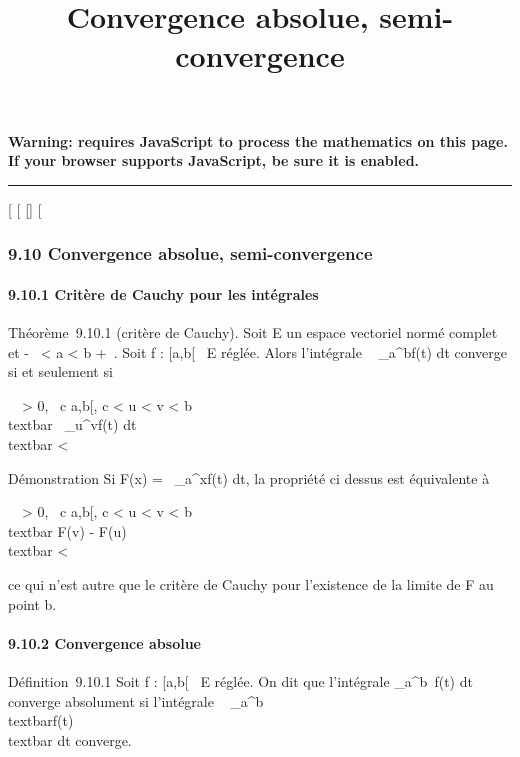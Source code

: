 \documentclass[]{article}
\title{Convergence absolue, semi-convergence}
\author{}
\date{}
\begin{document}
\maketitle

\textbf{Warning: 
requires JavaScript to process the mathematics on this page.\\ If your
browser supports JavaScript, be sure it is enabled.}

\begin{center}\rule{3in}{0.4pt}\end{center}

{[}
{[}
{[}{]}
{[}

\subsubsection{9.10 Convergence absolue, semi-convergence}

\paragraph{9.10.1 Critère de Cauchy pour les intégrales}

Théorème~9.10.1 (critère de Cauchy). Soit E un espace vectoriel normé
complet et -\infty~ \textless{} a \textless{} b \leq +\infty~. Soit f : {[}a,b{[}\rightarrow~ E
réglée. Alors l'intégrale \int ~
\_a^bf(t) dt converge si et seulement si~

\forall~~\epsilon \textgreater{} 0,
\exists~c \in {[}a,b{[}, c \textless{} u \textless{} v
\textless{} b \rigtharrow~\\textbar{}\int ~
\_u^vf(t) dt\\textbar{} \textless{} \epsilon

Démonstration Si F(x) =\int ~
\_a^xf(t) dt, la propriété ci dessus est équivalente à

\forall~~\epsilon \textgreater{} 0,
\exists~c \in {[}a,b{[}, c \textless{} u \textless{} v
\textless{} b \rigtharrow~\\textbar{} F(v) -
F(u)\\textbar{} \textless{} \epsilon

ce qui n'est autre que le critère de Cauchy pour l'existence de la
limite de F au point b.

\paragraph{9.10.2 Convergence absolue}

Définition~9.10.1 Soit f : {[}a,b{[}\rightarrow~ E réglée. On dit que l'intégrale
\int  \_a^b~f(t) dt converge
absolument si l'intégrale \int ~
\_a^b\\textbar{}f(t)\\textbar{}
dt converge.
\end{document}
